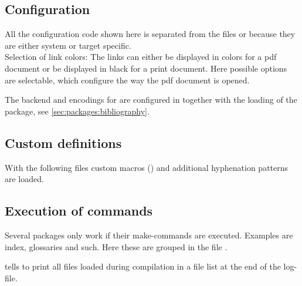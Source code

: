 
\subsection{Configuration}
\label{sec:preamble:configuration}
All the configuration code shown here is separated from the files  or  because they are either system or target specific.
\medskip\\\noindent
%
Selection of link colors: The links can either be displayed in colors for a pdf document or be displayed in black for a print document.
%
Here possible options are selectable, which configure the way the pdf document is opened.

The backend and encodings for  are configured in  together with the loading of the package, see \cref{sec:packages:bibliography}.
\subsection{Custom definitions}
\label{sec:preamble:custom}

With the following files custom macros () and additional hyphenation patterns  are loaded. 

\subsection{Execution of commands}
\label{sec:preamble:ExecutionOfCommands}
Several packages only work if their make-commands are executed. Examples are index, glossaries and such. Here these are grouped in the file . 

 tells \latex to print all files loaded during compilation in a file list at the end of the log-file.
%

